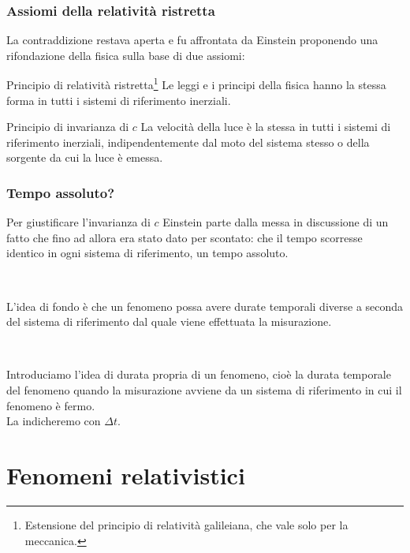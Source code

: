 \documentclass[]{beamer}
\theoremstyle{plain}
\begin{document}
\begin{frame}
\frametitle{Assiomi della relatività ristretta}
La contraddizione restava aperta e fu affrontata da Einstein proponendo una rifondazione della fisica sulla base di \alert<1>{due assiomi}:\pause
\begin{block}{Principio di relatività ristretta\footnote{Estensione del principio di relatività galileiana, che vale solo per la meccanica.}}
  Le leggi e i principi della fisica hanno la stessa forma in tutti i sistemi di riferimento inerziali.
\end{block}\pause
\begin{block}{Principio di invarianza di $ c $}
La velocità della luce è la stessa in tutti i sistemi di riferimento inerziali, indipendentemente dal moto del sistema stesso o della sorgente da cui la luce è emessa.
\end{block}
\end{frame}



\begin{frame}
  \frametitle{Tempo assoluto?}
  Per giustificare l'invarianza di $ c $ Einstein parte dalla messa in discussione di un fatto che fino ad allora era stato dato per scontato: che il tempo scorresse \alert<1>{identico in ogni sistema di riferimento}, un tempo assoluto.\pause
  
  ~
  
  L'idea di fondo è che un fenomeno possa avere durate temporali diverse a seconda del sistema di riferimento dal quale viene effettuata la misurazione.\pause
  
  ~
  
  Introduciamo l'idea di \alert{durata propria di un fenomeno}, cioè la durata temporale del fenomeno quando la misurazione avviene da un sistema di riferimento in cui il fenomeno è fermo.\\
  La indicheremo con $ \Delta t $.
\end{frame}





\section{Fenomeni relativistici}
\end{document}
